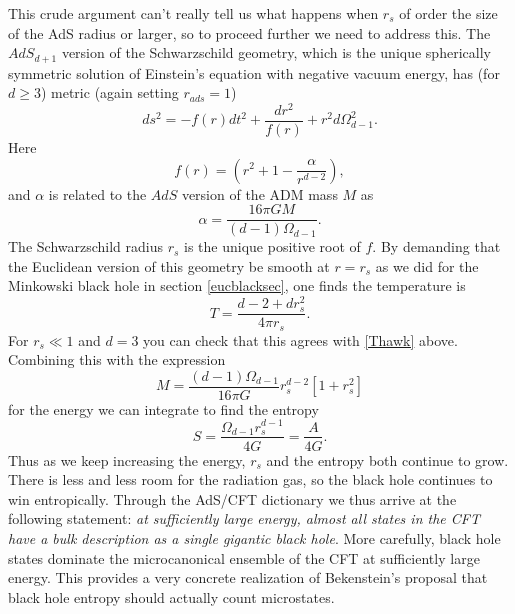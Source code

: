 \documentclass[12pt]{article}
\newcommand{\be}{\begin{equation}}
\newcommand{\ee}{\end{equation}}
\begin{document}
This crude argument can't really tell us what happens when $r_s$ of order the size of the AdS radius or larger, so to proceed further we need to address this.  The $AdS_{d+1}$ version of the Schwarzschild geometry, which is the unique spherically symmetric solution of Einstein's equation with negative vacuum energy, has (for $d\geq 3$) metric (again setting $r_{\mathit{ads}}=1$)
\be\label{adsschg}
ds^2=-f(r)dt^2+\frac{dr^2}{f(r)}+r^2 d\Omega_{d-1}^2.
\ee
Here
\be\label{fdef}
f(r)=\left(r^2+1-\frac{\alpha}{r^{d-2}}\right),
\ee
and $\alpha$ is related to the $AdS$ version of the ADM mass $M$ as
\be
\alpha=\frac{16\pi G M}{(d-1)\Omega_{d-1}}.
\ee
The Schwarzschild radius $r_s$ is the unique positive root of $f$.  By demanding that the Euclidean version of this geometry be smooth at $r=r_s$ as we did for the Minkowski black hole in section \ref{eucblacksec}, one finds the temperature is
\be\label{adsT}
T=\frac{d-2+dr_s^2}{4\pi r_s}.
\ee
For $r_s\ll 1$ and $d=3$ you can check that this agrees with \eqref{Thawk} above. 
Combining this with the expression
\be\label{adsM}
M=\frac{(d-1)\Omega_{d-1}}{16\pi G} r_s^{d-2}\left[1+r_s^2\right]
\ee
for the energy we can integrate to find the entropy
\be\label{adsS}
S=\frac{\Omega_{d-1} r_s^{d-1}}{4 G}=\frac{A}{4G}.
\ee
Thus as we keep increasing the energy, $r_s$ and the entropy both continue to grow.  There is less and less room for the radiation gas, so the black hole continues to win entropically.  Through the AdS/CFT dictionary we thus arrive at the following statement: \textit{at sufficiently large energy, almost all states in the CFT have a bulk description as a single gigantic black hole}.  More carefully, black hole states dominate the microcanonical ensemble of the CFT at sufficiently large energy.  This provides a very concrete realization of Bekenstein's proposal that black hole entropy should actually count microstates.
\end{document}
